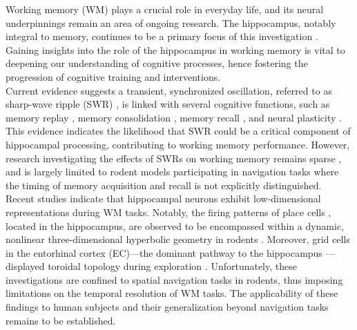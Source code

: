 \documentclass[final,3p,times,twocolumn]{elsarticle}
\begin{document}

Working memory (WM) plays a crucial role in everyday life, and its neural underpinnings remain an area of ongoing research. The hippocampus, notably integral to memory, continues to be a primary focus of this investigation \cite{scoville_loss_1957} \cite{squire_legacy_2009}  \cite{boran_persistent_2019} \cite{kaminski_persistently_2017} \cite{kornblith_persistent_2017} \cite{faraut_dataset_2018} \cite{borders_hippocampus_2022} \cite{li_functional_2023} \cite{dimakopoulos_information_2022}. Gaining insights into the role of the hippocampus in working memory is vital to deepening our understanding of cognitive processes, hence fostering the progression of cognitive training and interventions.
\\
\indent
Current evidence suggests a transient, synchronized oscillation, referred to as sharp-wave ripple (SWR) \cite{buzsaki_hippocampal_2015}, is linked with several cognitive functions, such as memory replay \cite{wilson_reactivation_1994} \cite{nadasdy_replay_1999} \cite{lee_memory_2002} \cite{diba_forward_2007} \cite{davidson_hippocampal_2009}, memory consolidation \cite{girardeau_selective_2009} \cite{ego-stengel_disruption_2010} \cite{fernandez-ruiz_long-duration_2019} \cite{kim_corticalhippocampal_2022}, memory recall \cite{wu_hippocampal_2017} \cite{norman_hippocampal_2019} \cite{norman_hippocampal_2021}, and neural plasticity \cite{behrens_induction_2005} \cite{norimoto_hippocampal_2018}. This evidence indicates the likelihood that SWR could be a critical component of hippocampal processing, contributing to working memory performance. However, research investigating the effects of SWRs on working memory remains sparse \cite{jadhav_awake_2012}, and is largely limited to rodent models participating in navigation tasks where the timing of memory acquisition and recall is not explicitly distinguished.
\\
\indent
Recent studies indicate that hippocampal neurons exhibit low-dimensional representations during WM tasks. Notably, the firing patterns of place cells \cite{okeefe_hippocampus_1971} \cite{okeefe_place_1976} \cite{ekstrom_cellular_2003} \cite{kjelstrup_finite_2008} \cite{harvey_intracellular_2009}, located in the hippocampus, are observed to be encompassed within a dynamic, nonlinear three-dimensional hyperbolic geometry in rodents \cite{zhang_hippocampal_2022}. Moreover, grid cells in the entorhinal cortex (EC)—the dominant pathway to the hippocampus \cite{naber_reciprocal_2001} \cite{van_strien_anatomy_2009} \cite{strange_functional_2014}—displayed toroidal topology during exploration \cite{gardner_toroidal_2022}. Unfortunately, these investigations are confined to spatial navigation tasks in rodents, thus imposing limitations on the temporal resolution of WM tasks. The applicability of these findings to human subjects and their generalization beyond navigation tasks remains to be established.
\end{document}
